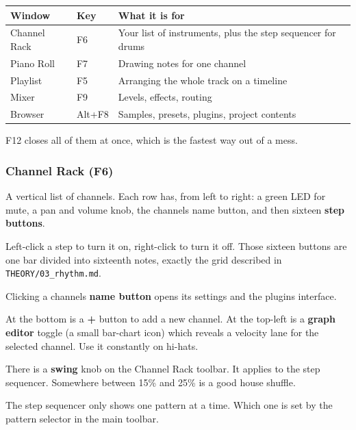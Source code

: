 {\def\LTcaptype{none} %
\begin{longtable}[]{@{}>{\raggedright\arraybackslash}p{}>{\raggedright\arraybackslash}p{}>{\raggedright\arraybackslash}p{}@{}}
\toprule\noalign{}
Window & Key & What it is for \\
\midrule\noalign{}
\endhead
\bottomrule\noalign{}
\endlastfoot
Channel Rack & F6 & Your list of instruments, plus the step sequencer for drums \\
Piano Roll & F7 & Drawing notes for one channel \\
Playlist & F5 & Arranging the whole track on a timeline \\
Mixer & F9 & Levels, effects, routing \\
Browser & Alt+F8 & Samples, presets, plugins, project contents \\
\end{longtable}
}

F12 closes all of them at once, which is the fastest way out of a mess.

\subsubsection{Channel Rack (F6)}\label{fl01_interface-channel-rack-f6}

A vertical list of channels. Each row has, from left to right: a green LED for mute, a pan
and volume knob, the channel\textquotesingle s name button, and then sixteen \textbf{step buttons}.

Left-click a step to turn it on, right-click to turn it off. Those sixteen buttons are one
bar divided into sixteenth notes, exactly the grid described in \texttt{THEORY/03\_rhythm.md}.

Clicking a channel\textquotesingle s \textbf{name button} opens its settings and the plugin\textquotesingle s interface.

At the bottom is a \textbf{+} button to add a new channel. At the top-left is a \textbf{graph editor}
toggle (a small bar-chart icon) which reveals a velocity lane for the selected channel. Use
it constantly on hi-hats.

There is a \textbf{swing} knob on the Channel Rack toolbar. It applies to the step sequencer.
Somewhere between 15\% and 25\% is a good house shuffle.

The step sequencer only shows one pattern at a time. Which one is set by the pattern selector
in the main toolbar.

